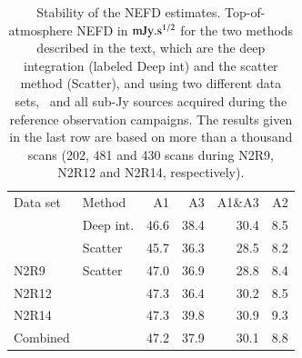 \begin{table}[!htbp]
  \centering
  \caption[]{Stability of the NEFD estimates. Top-of-atmosphere NEFD
    in $\rm{mJy}.s^{1/2}$ for the two methods described in the text, which
  are the deep integration (labeled Deep int) and the scatter method
  (Scatter), and using two different data sets, \hls\
  and all sub-Jy sources acquired during the reference observation
  campaigns. The results given in the last row are based on more than a thousand
  scans (202, 481 and 430 scans during N2R9, N2R12 and N2R14, respectively).}
  \label{tab:nefd_summary}
  \begin{tabular}{llrrrr}
    \hline\hline
    \noalign{\smallskip}
    Data set   & Method   & A1      &   A3    &   A1\&A3 &    A2 \\
    \noalign{\smallskip}
    \hline
    \noalign{\smallskip}
    \hls &     Deep int.  &  46.6  &    38.4  &    30.4  &   8.5  \\
         &     Scatter    &  45.7  &    36.3  &    28.5  &   8.2  \\
    \hline
    \noalign{\smallskip}
    N2R9     & Scatter    & 47.0 &  36.9  & 28.8  & 8.4 \\
    N2R12    &            & 47.3 &  36.4  & 30.2  & 8.5 \\
    N2R14    &            & 47.3 &  39.8  & 30.9  & 9.3 \\
    Combined &            & 47.2 &  37.9  & 30.1  & 8.8 \\
    \hline
  \end{tabular}
\end{table}

